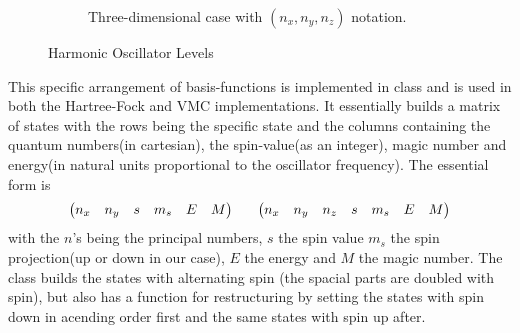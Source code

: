 \begin{figure}[H]
\begin{subfigure}[b!]{0.49\textwidth}
                \caption{Three-dimensional case with $(n_x,n_y,n_z)$ notation.}
                \label{subfig:3Dspin}
            \end{subfigure}
            \caption{Harmonic Oscillator Levels}
            \justify
        \end{figure}
    This specific arrangement of basis-functions is implemented in class
     and is used in both the Hartree-Fock and VMC
    implementations. It essentially builds a matrix of states with the rows
    being the specific state and the columns containing the quantum numbers(in
    cartesian), the spin-value(as an integer), magic number and energy(in
    natural units proportional to the oscillator frequency). The essential form
    is
        \begin{equation}
            \begin{aligned}
                \begin{pmatrix}
                    n_x & n_y & s & m_s & E & M
                \end{pmatrix}
                \indent
                \begin{pmatrix}
                    n_x & n_y & n_z & s & m_s & E & M
                \end{pmatrix}
            \end{aligned}
        \end{equation}
    with the $n$'s being the principal numbers, $s$ the spin value $m_s$ the
    spin projection(up or down in our case), $E$ the energy and $M$ the magic
    number. The  class builds the states with alternating
    spin (the spacial parts are doubled with spin), but also has a function for
    restructuring by setting the states with spin down in acending order first
    and the same states with spin up after.

